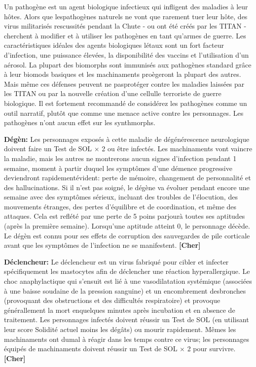 Un pathogène est un agent biologique infectieux qui infligent des maladies à leur hôtes. Alors que lespathogènes naturels ne vont que rarement tuer leur hôte, des virus militarisés rescussités pendant la Chute - ou ont été créés par les TITAN - cherchent à modifier et à utiliser les pathogènes en tant qu'armes de guerre. Les caractéristiques idéales des agents biologiques létaux sont un fort facteur d'infection, une puissance élevées, la disponibilité des vaccins et l'utilisation d'un aérosol. La plupart des biomorphs sont immunisés aux pathogènes standard grâce à leur biomods basiques et les machinaments proègeront la plupart des autres. Mais même ces défenses peuvent ne pasprotéger contre les maladies laissées par les TITAN ou par la nouvelle création d'une cellulle terroriste de guerre biologique. Il est fortement recommandé de considérez les pathogènes comme un outil narratif, plutôt que comme une menace active contre les personnages. Les pathogènes n'ont aucun effet sur les synthmorphs. 

\textbf{Dégèn:} Les personnages exposés à cette maladie de dégénérescence neurologique doivent faire un Test de SOL $\times$ 2 ou être infectés. Les machinaments vont vaincre la maladie, mais les autres ne montrerons aucun signes d'infection pendant 1 semaine, moment à partir duquel les symptômes d'une démence progressive deviendront rapidementévident: perte de mémoire, changement de personnalité et des hallucinations. Si il n'est pas soigné, le dégène va évoluer pendant encore une semaine avec des symptômes sérieux, incluant des troubles de l'élocution, des mouvements étranges, des pertes d'équilibre et de coordination, et même des attaques. Cela est reflété par une perte de 5 poins parjourà toutes ses aptitudes (après la première semaine). Lorsqu'une aptitude atteint 0, le personnage décède. Le dégèn est connu pour ses effets de corruption des sauvegardes de pile corticale avant que les symptômes de l'infection ne se manifestent. \textbf{[Cher]} 

\textbf{Déclencheur:} Le déclencheur est un virus fabriqué pour cibler et infecter spécifiquement les mastocytes afin de déclencher une réaction hyperallergique. Le choc anaphylactique qui s'ensuit est lié à une vasodilatation systémique (associées à une baisse soudaine de la pression sanguine) et un encombrement desbronches (provoquant des obstructions et des difficultés respiratoire) et provoque générallement la mort enquelques minutes après incubation et en absence de traitement. Les personnages infectés doivent réussir un Test de SOL (en utilisant leur score Solidité actuel moins les dégâts) ou mourir rapidement. Mêmes les machinaments ont dumal à réagir dans les temps contre ce virus; les personnages équipés de machinaments doivent réussir un Test de SOL $\times$ 2 pour survivre. \textbf{[Cher]} 

